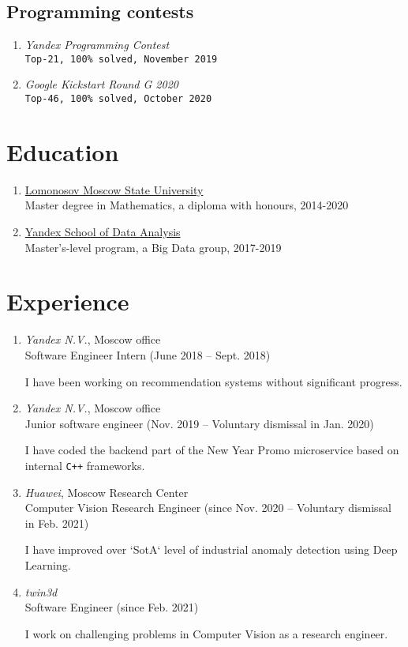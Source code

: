 \documentclass[twocolumn,10pt]{extarticle}
\begin{document}
\subsection{Programming contests}
\begin{enumerate}
  \item \textit{Yandex Programming Contest} \\
    \quad \texttt{Top-21, 100\% solved, November 2019}
  \item \textit{Google Kickstart Round G 2020} \\
    \quad \texttt{Top-46, 100\% solved, October 2020}
\end{enumerate}

\vfill

\section{Education}

\begin{enumerate}
  \item \href{https://www.msu.ru/en/}{Lomonosov Moscow State University} \\
    \quad Master degree in Mathematics, a diploma with honours, 2014-2020
  \item \href{https://yandexdataschool.com}{Yandex School of Data Analysis} \\
    \quad Master’s-level program, a Big Data group, 2017-2019
\end{enumerate}

\section{Experience}

\begin{enumerate}
  \item \textit{Yandex N.V.}, Moscow office \\
    \quad Software Engineer Intern (June 2018 -- Sept. 2018)

    \quad I have been working on recommendation systems without significant progress.
  \item \textit{Yandex N.V.}, Moscow office \\
    \quad Junior software engineer (Nov. 2019 -- Voluntary dismissal in Jan. 2020)

    \quad I have coded the backend part of the New Year Promo microservice based on internal \texttt{C++} frameworks.
  \item \textit{Huawei}, Moscow Research Center \\
    \quad Computer Vision Research Engineer (since Nov. 2020 -- Voluntary dismissal in Feb. 2021)

    \quad I have improved over `SotA` level of industrial anomaly detection using Deep Learning.
  \item \textit{twin3d} \\
    \quad Software Engineer (since Feb. 2021)

    \quad I work on challenging problems in Computer Vision as a research engineer.
\end{enumerate}
\end{document}
